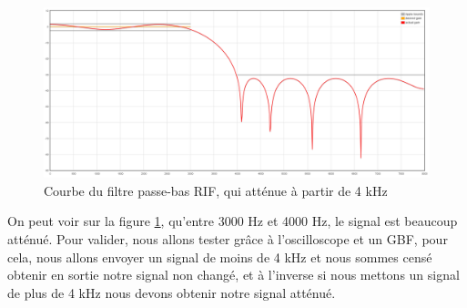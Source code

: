 \documentclass[a4paper,11pt]{article}
\begin{document}
\begin{figure}[H]
\begin{center}
\includegraphics[scale=0.45]{images/rif3.png}
\caption{Courbe du filtre passe-bas RIF, qui atténue à partir de 4 kHz}\label{fig:freq_attenue}
\end{center}
\end{figure}
On peut voir sur la figure \ref{fig:freq_attenue}, qu'entre 3000 Hz et 4000 Hz, le signal est beaucoup atténué. Pour valider, nous allons tester grâce à l'oscilloscope et un GBF, pour cela, nous allons envoyer un signal de moins de 4 kHz et nous sommes censé obtenir en sortie notre signal non changé, et à l'inverse si nous mettons un signal de plus de 4 kHz nous devons obtenir notre signal atténué.
\end{document}
